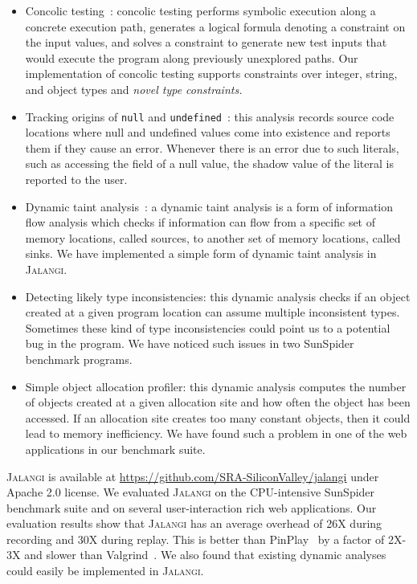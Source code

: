 \documentclass{sig-alternate}
\def\jalangi{\textsc{Jalangi}}
\begin{document}
\begin{itemize}
\item Concolic testing~\cite{dart,cute}: concolic testing performs
  symbolic execution along a concrete execution path, generates a
  logical formula denoting a constraint on the input values, and
  solves a constraint to generate new test inputs that would execute
  the program along previously unexplored paths.  Our implementation
  of concolic testing supports constraints over integer, string, and
  object types and \emph{novel type constraints.}
\item Tracking origins of \texttt{null} and
  \texttt{undefined}~\cite{Bond:2007:TBA:1297027.1297057}: this
  analysis records source code locations where null and undefined
  values come into existence and reports them if they cause an error.
  Whenever there is an error due to such literals, such as accessing
  the field of a null value, the shadow value of the literal is
  reported to the user.
\item Dynamic taint
  analysis~\cite{songndss05,Clause:2007:DGD:1273463.1273490}: a
  dynamic taint analysis is a form of information flow analysis which
  checks if information can flow from a specific set of memory
  locations, called sources, to another set of memory locations,
  called sinks.  We have implemented a simple form of dynamic taint
  analysis in \jalangi{}.
\item Detecting likely type inconsistencies: this dynamic analysis
  checks if an object created at a given program location can assume
  multiple inconsistent types.  Sometimes these kind of type
  inconsistencies could point us to a potential bug in the program.
  We have noticed such issues in two SunSpider benchmark programs.
\item Simple object allocation profiler: this dynamic analysis
  computes the number of objects created at a given allocation site
  and how often the object has been accessed.  If an allocation site
  creates too many constant objects, then it could lead to memory
  inefficiency.  We have found such a problem in one of the web
  applications in our benchmark suite.
\end{itemize}

\jalangi{} is available at
\url{https://github.com/SRA-SiliconValley/jalangi} under Apache 2.0
license.  We evaluated \jalangi{} on the CPU-intensive SunSpider
benchmark suite and on several user-interaction rich web applications.
Our evaluation results show that \jalangi{} has an average overhead of
26X during recording and 30X during replay.  This is better than
PinPlay~\cite{Patil:2010:PFD:1772954.1772958} by a factor of 2X-3X and
slower than Valgrind~\cite{Nethercote:2007:VFH:1250734.1250746}.  We
also found that existing dynamic analyses could easily be implemented
in \jalangi{}.  
\end{document}
